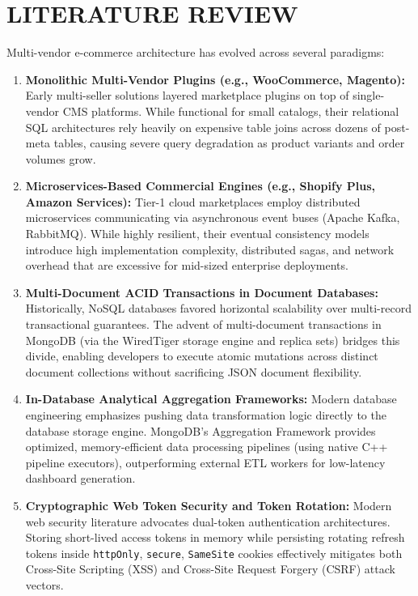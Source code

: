 \documentclass[12pt,a4paper]{report}
\begin{document}
\section{LITERATURE REVIEW}
Multi-vendor e-commerce architecture has evolved across several paradigms:
\begin{enumerate}[leftmargin=1.5cm]
    \item \textbf{Monolithic Multi-Vendor Plugins (e.g., WooCommerce, Magento):} Early multi-seller solutions layered marketplace plugins on top of single-vendor CMS platforms. While functional for small catalogs, their relational SQL architectures rely heavily on expensive table joins across dozens of post-meta tables, causing severe query degradation as product variants and order volumes grow.
    \item \textbf{Microservices-Based Commercial Engines (e.g., Shopify Plus, Amazon Services):} Tier-1 cloud marketplaces employ distributed microservices communicating via asynchronous event buses (Apache Kafka, RabbitMQ). While highly resilient, their eventual consistency models introduce high implementation complexity, distributed sagas, and network overhead that are excessive for mid-sized enterprise deployments.
    \item \textbf{Multi-Document ACID Transactions in Document Databases:} Historically, NoSQL databases favored horizontal scalability over multi-record transactional guarantees. The advent of multi-document transactions in MongoDB (via the WiredTiger storage engine and replica sets) bridges this divide, enabling developers to execute atomic mutations across distinct document collections without sacrificing JSON document flexibility.
    \item \textbf{In-Database Analytical Aggregation Frameworks:} Modern database engineering emphasizes pushing data transformation logic directly to the database storage engine. MongoDB's Aggregation Framework provides optimized, memory-efficient data processing pipelines (using native C++ pipeline executors), outperforming external ETL workers for low-latency dashboard generation.
    \item \textbf{Cryptographic Web Token Security and Token Rotation:} Modern web security literature advocates dual-token authentication architectures. Storing short-lived access tokens in memory while persisting rotating refresh tokens inside \texttt{httpOnly}, \texttt{secure}, \texttt{SameSite} cookies effectively mitigates both Cross-Site Scripting (XSS) and Cross-Site Request Forgery (CSRF) attack vectors.
\end{enumerate}
\end{document}
